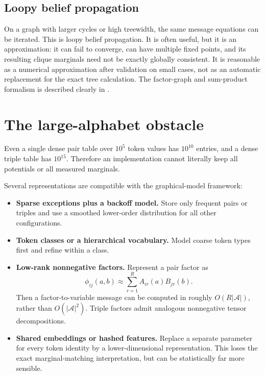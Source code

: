 \documentclass[11pt]{article}
\newcommand{\1}{\mathbf 1}
\newcommand{\mcA}{\mathcal A}
\begin{document}
\subsection{Loopy belief propagation}

On a graph with larger cycles or high treewidth, the same message equations can
be iterated.  This is loopy belief propagation.  It is often useful, but it is
an approximation: it can fail to converge, can have multiple fixed points, and
its resulting clique marginals need not be exactly globally consistent.  It is
reasonable as a numerical approximation after validation on small cases, not as
an automatic replacement for the exact tree calculation.  The factor-graph and
sum-product formalism is described clearly in \cite{kschischang}.

\section{The large-alphabet obstacle}

Even a single dense pair table over \(10^5\) token values has \(10^{10}\)
entries, and a dense triple table has \(10^{15}\).  Therefore an implementation
cannot literally keep all potentials or all measured marginals.

Several representations are compatible with the graphical-model framework:
\begin{itemize}
  \item \textbf{Sparse exceptions plus a backoff model.}
  Store only frequent pairs or triples and use a smoothed lower-order
  distribution for all other configurations.
  \item \textbf{Token classes or a hierarchical vocabulary.}
  Model coarse token types first and refine within a class.
  \item \textbf{Low-rank nonnegative factors.}
  Represent a pair factor as
  \[
    \phi_{ij}(a,b)
    \approx
    \sum_{r=1}^R A_{ir}(a)B_{jr}(b).
  \]
  Then a factor-to-variable message can be computed in roughly
  \(O(R\lvert\mcA\rvert)\), rather than \(O(\lvert\mcA\rvert^2)\).
  Triple factors admit analogous nonnegative tensor decompositions.
  \item \textbf{Shared embeddings or hashed features.}
  Replace a separate parameter for every token identity by a lower-dimensional
  representation.  This loses the exact marginal-matching interpretation, but
  can be statistically far more sensible.
\end{itemize}
\end{document}

